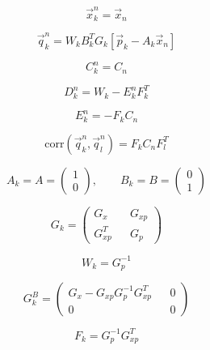 \begin{equation}
\vec{x}_k^n = \vec{x}_n
\end{equation}

\begin{equation}
\vec{q}_k^n = W_k B_k^T G_k \left[
	\vec{p}_k - A_k \vec{x}_n
\right]
\end{equation}

\begin{equation}
C_k^n = C_n
\end{equation}

\begin{equation}
D_k^n = W_k - E_k^n F_k^T
\end{equation}

\begin{equation}
E_k^n = - F_k C_n
\end{equation}

\begin{equation}
\text{corr}\left(
	\vec{q}_k^n, \vec{q}_l^n
\right) = F_k C_n F_l^T
\end{equation}

\begin{equation}
A_k = A = \begin{pmatrix}
1 \\
0
\end{pmatrix},
\quad\quad 
B_k = B = \begin{pmatrix}
0 \\
1
\end{pmatrix}
\end{equation}

\begin{equation}
G_k = \begin{pmatrix}
G_x 		&& G_{xp} \\
G^T_{xp} 	&& G_p
\end{pmatrix}
\end{equation}

\begin{equation}
W_k = G_p^{-1}
\end{equation}

\begin{equation}
G_k^B = \begin{pmatrix}
G_x - G_{xp}G_p^{-1}G_{xp}^T 	&& 0 \\
0								&& 0
\end{pmatrix}
\end{equation}

\begin{equation}
F_k = G_p^{-1} G_{xp}^T
\end{equation}

